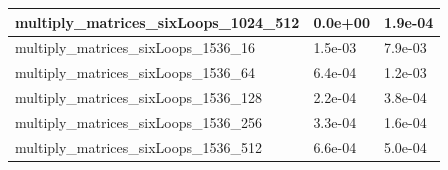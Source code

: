 \documentclass{scrartcl}
\begin{document}
\begin{table}[H]
\begin{tabular}{|l|l|l|}
multiply\_matrices\_sixLoops\_1024\_512 & 0.0e+00           & 1.9e-04            \\ \hline
multiply\_matrices\_sixLoops\_1536\_16  & 1.5e-03           & 7.9e-03            \\ \hline
multiply\_matrices\_sixLoops\_1536\_64  & 6.4e-04           & 1.2e-03            \\ \hline
multiply\_matrices\_sixLoops\_1536\_128 & 2.2e-04           & 3.8e-04            \\ \hline
multiply\_matrices\_sixLoops\_1536\_256 & 3.3e-04           & 1.6e-04            \\ \hline
multiply\_matrices\_sixLoops\_1536\_512 & 6.6e-04           & 5.0e-04            \\ \hline
\end{tabular}
\end{table}
\end{document}
